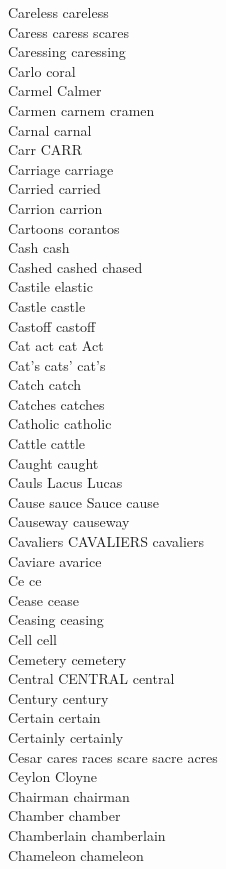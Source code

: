 Careless careless\\
Caress caress scares\\
Caressing caressing\\
Carlo coral\\
Carmel Calmer\\
Carmen carnem cramen\\
Carnal carnal\\
Carr CARR\\
Carriage carriage\\
Carried carried\\
Carrion carrion\\
Cartoons corantos\\
Cash cash\\
Cashed cashed chased\\
Castile elastic\\
Castle castle\\
Castoff castoff\\
Cat act cat Act\\
Cat's cats' cat's\\
Catch catch\\
Catches catches\\
Catholic catholic\\
Cattle cattle\\
Caught caught\\
Cauls Lacus Lucas\\
Cause sauce Sauce cause\\
Causeway causeway\\
Cavaliers CAVALIERS cavaliers\\
Caviare avarice\\
Ce ce\\
Cease cease\\
Ceasing ceasing\\
Cell cell\\
Cemetery cemetery\\
Central CENTRAL central\\
Century century\\
Certain certain\\
Certainly certainly\\
Cesar cares races scare sacre acres\\
Ceylon Cloyne\\
Chairman chairman\\
Chamber chamber\\
Chamberlain chamberlain\\
Chameleon chameleon\\
